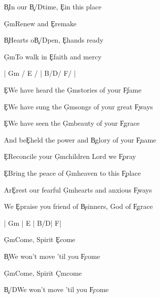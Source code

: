 \documentclass[9pt]{extarticle}
\begin{document}
\bsong

\bc
\c{B}In our \c{B/D\s }time, \c{E}in this place

\c{G\s m}Renew and \c{E}remake

\c{B}Hearts o\c{B/D\s }pen, \c{E}hands ready

\c{G\s m}To walk in \c{E}faith and mercy
\ec

\bin
|  G\s m / E /  |  B/D\s  / F\s  /  |
\ein

\bv
\c{E}We have heard the \c{G\s m}stories of your \c{F\s }fame

\c{E}We have sung the \c{G\s m}songs of your great \c{F\s }ways

\c{E}We have seen the \c{G\s m}beauty of your \c{F\s }grace

And be\c{E}held the power and \c{B}glory of your \c{F\s }name
\ev



\bv
\c{E}Reconcile your \c{G\s m}children Lord we \c{F\s }pray

\c{E}Bring the peace of \c{G\s m}heaven to this \c{F\s }place

Ar\c{E}rest our fearful \c{G\s m}hearts and anxious \c{F\s }ways

We \c{E}praise you friend of \c{B}sinners, God of \c{F\s }grace
\ev


\bin
| G\s m | E |  B/D\s   | F\s  |
\ein

\bb[3]
\c{G\s m}Come, Spirit \c{E}come

\c{B}We won't move 'til you \c{F\s }come
\eb

\bb
\c{G\s m}Come, Spirit \c{C\s m}come

\c{B/D\s }We won't move 'til you \c{F\s }come
\eb


\esong
\end{document}
